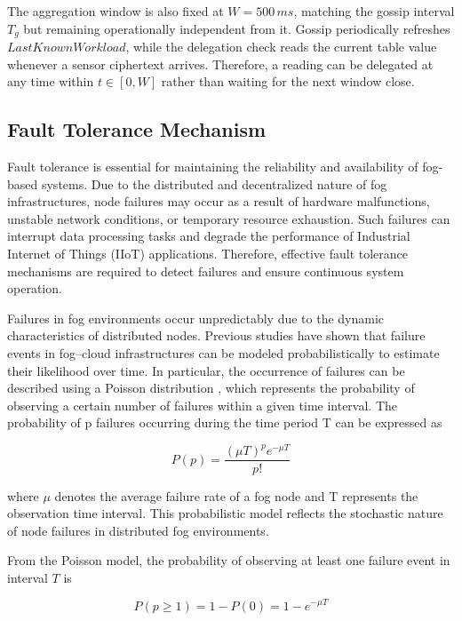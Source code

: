 \documentclass[conference]{IEEEtran}
\begin{document}
    The aggregation window is also fixed at $W=500\,ms$, matching the gossip interval $T_g$ but remaining operationally independent from it. Gossip periodically refreshes $LastKnownWorkload$, while the delegation check reads the current table value whenever a sensor ciphertext arrives. Therefore, a reading can be delegated at any time within $t\in[0,W]$ rather than waiting for the next window close.

    \subsection{Fault Tolerance Mechanism}
    Fault tolerance is essential for maintaining the reliability and availability of fog-based systems. Due to the distributed and decentralized nature of fog infrastructures, node failures may occur as a result of hardware malfunctions, unstable network conditions, or temporary resource exhaustion. Such failures can interrupt data processing tasks and degrade the performance of Industrial Internet of Things (IIoT) applications. Therefore, effective fault tolerance mechanisms are required to detect failures and ensure continuous system operation.

    Failures in fog environments occur unpredictably due to the dynamic characteristics of distributed nodes. Previous studies have shown that failure events in fog–cloud infrastructures can be modeled probabilistically to estimate their likelihood over time. In particular, the occurrence of failures can be described using a Poisson distribution \cite{abdelbasset2019fault}, which represents the probability of observing a certain number of failures within a given time interval. The probability of p failures occurring during the time period T can be expressed as

    \begin{equation}
    P(p) = \frac{(\mu T)^p e^{-\mu T}}{p!}
    \end{equation}

    where $\mu$ denotes the average failure rate of a fog node and T represents the observation time interval. This probabilistic model reflects the stochastic nature of node failures in distributed fog environments.

    From the Poisson model, the probability of observing at least one failure event in interval $T$ is

    \begin{equation}
    P(p \geq 1) = 1 - P(0) = 1 - e^{-\mu T}
    \end{equation}
\end{document}
